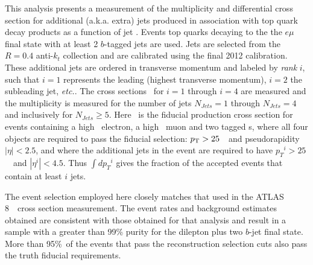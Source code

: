This analysis presents a measurement of the multiplicity and differential 
cross section for additional (a.k.a. extra) jets produced in 
association with top quark decay products as a function of jet \pT. Events top quarks decaying to the the $e\mu$ final state with at least 2 $b$-tagged jets are used.   Jets are selected from the  $R=0.4$ anti-$k_t$
collection and are calibrated using the final 2012 calibration. These additional jets are ordered 
in transverse momentum and labeled by \textit{rank} $i$, such that $i=1$ represents 
the leading (highest transverse momentum),  $i=2$ the subleading jet, \textit{ etc.}.  The cross sections
\sigmapti\ for $i=1$ through $i=4$ are measured and 
the multiplicity is measured for the number of jets $N_{Jets}=1$ through $N_{Jets}=4$ 
and inclusively for  $N_{Jets}\ge 5$.  Here \sigemubb\ is the fiducial production cross section 
for  events containing a high \pT\ electron, a high \pT\ muon and two tagged \bjet s,
where all four objects are required to pass the fiducial selection:  $p_{\text{T}}>25$~\GeV\ and pseudorapidity $|\eta|<2.5$,
and where the  additional jets in the event are required to have
${p_T}^{i}>25$~\GeV\ and $|\eta^{i}|<4.5$. Thus  $\int$\sigmapti $d{p_T}^{i}$ gives
the fraction of the accepted events that contain at least $i$ jets.

The event selection employed here closely matches that used in the ATLAS 8~\TeV\ cross
section measurement\cite{xsec}. The event rates and background estimates obtained 
are consistent with those obtained for that analysis and result in a sample with a greater than 99\% purity
for the dilepton plus two $b$-jet final state. More than 95\%\ of
the events that pass the reconstruction selection cuts also pass the truth fiducial requirements.

